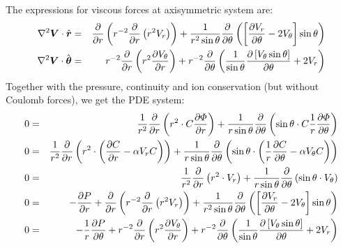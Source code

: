 The expressions for viscous forces at axisymmetric system are:
\begin{eqnarray}
\nabla^2 \boldsymbol{V} \cdot \hat{\boldsymbol{r}} &=&
 \frac{\partial }{\partial r} \left(r^{-2}\frac{\partial }{\partial r}\left(r^2 V_r\right)
 \right)
 + \frac{1}{r^2 \sin\theta} \frac{\partial }{\partial \theta}
 \left( \left[\frac{\partial V_r}{\partial \theta} - 2 V_\theta \right] \sin\theta \right)
\\
\nabla^2 \boldsymbol{V} \cdot \hat{\boldsymbol{\theta}} &=& r^{-2}
\frac{\partial }{\partial r}\left( r^2 \frac{\partial V_\theta}{\partial r} \right)
+ r^{-2} \frac{\partial }{\partial \theta} \left( \frac{1}{\sin\theta}
\frac{\partial \left[V_\theta \sin\theta\right]}{\partial \theta}
+ 2V_r \right)
\end{eqnarray}
Together with the pressure, continuity and ion conservation (but without Coulomb forces),
we get the PDE system:
\begin{eqnarray}
0 &=& \frac{1}{r^2}\frac{\partial }{\partial r} \left( r^2 \cdot C \frac{\partial \varPhi}{\partial r}\right)
  + \frac{1}{r \sin\theta} \frac{\partial }{\partial \theta} \left( \sin\theta \cdot C \frac{1}{r}\frac{\partial \varPhi}{\partial \theta}\right)
\\
0 &=& \frac{1}{r^2}\frac{\partial }{\partial r} \left( r^2 \cdot
  \left(\frac{\partial C}{\partial r} - \alpha V_r C\right)\right)
  + \frac{1}{r \sin\theta} \frac{\partial }{\partial \theta} \left( \sin\theta \cdot
  \left(\frac{1}{r}\frac{\partial C}{\partial \theta} - \alpha V_\theta C\right)\right)
\\
0 &=& \frac{1}{r^2}\frac{\partial }{\partial r} \left( r^2 \cdot V_r\right)
  + \frac{1}{r \sin\theta} \frac{\partial }{\partial \theta} \left( \sin\theta \cdot V_\theta\right)
\\
0 &=& -\frac{\partial P}{\partial r} + \frac{\partial }{\partial r} \left(r^{-2}\frac{\partial }{\partial r}\left(r^2 V_r\right) \right)
 + \frac{1}{r^2 \sin\theta} \frac{\partial }{\partial \theta}
 \left( \left[\frac{\partial V_r}{\partial \theta} - 2 V_\theta \right] \sin\theta \right)
\\
0 &=& -\frac{1}{r}\frac{\partial P}{\partial \theta} + r^{-2} \frac{\partial }{\partial r}\left( r^2 \frac{\partial V_\theta}{\partial r} \right)
+ r^{-2} \frac{\partial }{\partial \theta} \left( \frac{1}{\sin\theta}
\frac{\partial \left[V_\theta \sin\theta\right]}{\partial \theta}
+ 2V_r \right)
\end{eqnarray}
